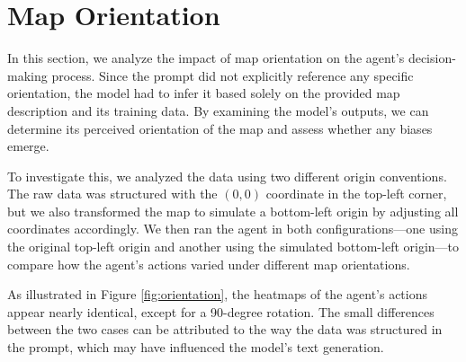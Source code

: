 \section{Map Orientation}

In this section, we analyze the impact of map orientation on the agent's
decision-making process. Since the prompt did not explicitly reference any specific
orientation, the model had to infer it based solely on the provided map
description and its training data. By examining the model's outputs, we can
determine its perceived orientation of the map and assess whether any biases
emerge.

To investigate this, we analyzed the data using two different origin conventions.
The raw data was structured with the $(0,0)$ coordinate in the top-left corner, but
we also transformed the map to simulate a bottom-left origin by adjusting all coordinates
accordingly. We then ran the agent in both configurations—one using the original
top-left origin and another using the simulated bottom-left origin—to compare
how the agent's actions varied under different map orientations.

As illustrated in Figure \ref{fig:orientation}, the heatmaps of the agent's actions
appear nearly identical, except for a 90-degree rotation. The small differences between
the two cases can be attributed to the way the data was structured in the prompt,
which may have influenced the model's text generation.

